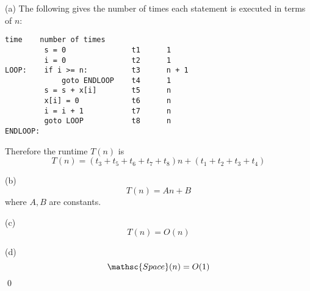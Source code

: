(a) The following gives the number of times each statement is executed
in terms of $n$:
\begin{Verbatim}[frame=single, fontsize=\small]
                             time    number of times 
         s = 0               t1      1
         i = 0               t2      1
LOOP:    if i >= n:          t3      n + 1
             goto ENDLOOP    t4      1
         s = s + x[i]        t5      n
         x[i] = 0            t6      n
         i = i + 1           t7      n
         goto LOOP           t8      n
ENDLOOP:
\end{Verbatim}
Therefore the runtime $T(n)$ is
\[
T(n) = (t_3 + t_5 + t_6 + t_7 + t_8)n + (t_1 + t_2 + t_3 + t_4)
\]

(b)
\[
T(n) = An + B
\]
where $A, B$ are constants.

(c)
\[
T(n) = O(n)
\]

(d)
\[
\mathsc{Space}(n) = O(1)
\]
\qed
